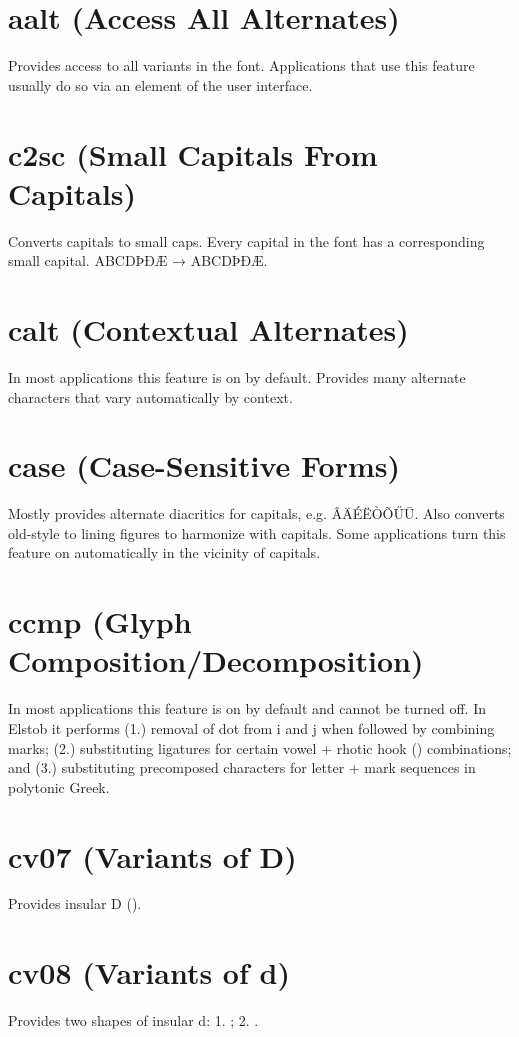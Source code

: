 \documentclass[12pt,letterpaper,openany]{book}
\begin{document}
\section{aalt (Access All Alternates)}
Provides access to all variants in the font. Applications that use this feature
usually do so via an element of the user interface.

\section{c2sc (Small Capitals From Capitals)}
Converts capitals to small caps. Every capital in the font has a corresponding
small capital. ABCDÞÐÆ → { ABCDÞÐÆ}.

\section{calt (Contextual Alternates)}
In most applications this feature is on by default.
Provides many alternate characters that vary automatically by context.

\section{case (Case-Sensitive Forms)}
Mostly provides alternate diacritics for capitals, e.g. ÂÄÉËÒÕŰŪ. Also converts
old-style to lining figures to harmonize with capitals. Some applications turn
this feature on automatically in the vicinity of capitals.

\section{ccmp (Glyph Composition/Decomposition)}
In most applications this feature is on by default and cannot be turned off.
In Elstob it performs (1.) removal of dot from i and j when followed by combining
marks; (2.) substituting ligatures for certain vowel + rhotic hook ()
combinations; and (3.) substituting precomposed characters for letter +
mark sequences in polytonic Greek.

\section{cv07 (Variants of D)}
Provides insular D ().

\section{cv08 (Variants of d)}
Provides two shapes of insular d: 1. ; 2. .
\end{document}
